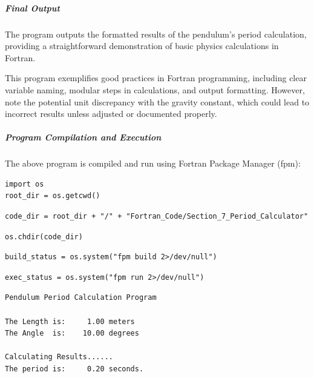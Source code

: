 \subparagraph{Final Output}

The program outputs the formatted results of the pendulum's period calculation, providing a straightforward demonstration of basic physics calculations in Fortran.

This program exemplifies good practices in Fortran programming, including clear variable naming, modular steps in calculations, and output formatting. However, note the potential unit discrepancy with the gravity constant, which could lead to incorrect results unless adjusted or documented properly.

\subparagraph{Program Compilation and Execution}

The above program is compiled and run using Fortran Package Manager (fpm):

\begin{verbatim}
import os
root_dir = os.getcwd()
\end{verbatim}

\begin{verbatim}
code_dir = root_dir + "/" + "Fortran_Code/Section_7_Period_Calculator"
\end{verbatim}

\begin{verbatim}
os.chdir(code_dir)
\end{verbatim}

\begin{verbatim}
build_status = os.system("fpm build 2>/dev/null")
\end{verbatim}

\begin{verbatim}
exec_status = os.system("fpm run 2>/dev/null")
\end{verbatim}

\begin{verbatim}
Pendulum Period Calculation Program

The Length is:     1.00 meters
The Angle  is:    10.00 degrees

Calculating Results......
The period is:     0.20 seconds.
\end{verbatim}